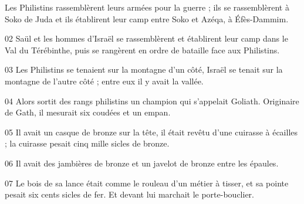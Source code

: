 Les Philistins rassemblèrent leurs armées pour la guerre ; ils se rassemblèrent à Soko de Juda et ils établirent leur camp entre Soko et Azéqa, à Éfès-Dammim.

02 Saül et les hommes d’Israël se rassemblèrent et établirent leur camp dans le Val du Térébinthe, puis se rangèrent en ordre de bataille face aux Philistins.

03 Les Philistins se tenaient sur la montagne d’un côté, Israël se tenait sur la montagne de l’autre côté ; entre eux il y avait la vallée.

04 Alors sortit des rangs philistins un champion qui s’appelait Goliath. Originaire de Gath, il mesurait six coudées et un empan.

05 Il avait un casque de bronze sur la tête, il était revêtu d’une cuirasse à écailles ; la cuirasse pesait cinq mille sicles de bronze.

06 Il avait des jambières de bronze et un javelot de bronze entre les épaules.

07 Le bois de sa lance était comme le rouleau d’un métier à tisser, et sa pointe pesait six cents sicles de fer. Et devant lui marchait le porte-bouclier.
